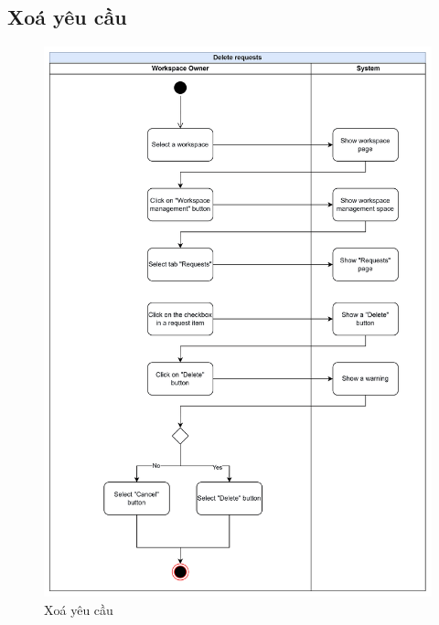 \subsection{Xoá yêu cầu}
    \begin{figure}[H]
        \centering
        \includegraphics[width=0.8\linewidth]{Content/Phân tích và thiết kế hệ thống/documents/Sơ đồ hoạt động/images/deleteRequests.png}
        \vspace{0.5cm}
        \caption{Xoá yêu cầu}
        \label{fig:Xoá yêu cầu}
    \end{figure}